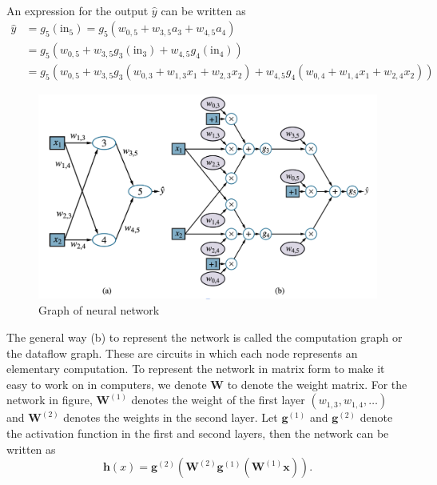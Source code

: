 \documentclass{article}
\begin{document}
      \paragraph{} An expression for the output $\hat{y}$ can be written as 
           \begin{align*}
            \hat{y} &= g_5(\text{in}_5) = g_5(w_{0,5} + w_{3,5}a_3 + w_{4,5}a_4)\\
            &= g_5(w_{0,5} + w_{3,5}g_3(\text{in}_3) + w_{4,5}g_4(\text{in}_4))\\
            &= g_5(w_{0,5} + w_{3,5}g_3(w_{0,3} + w_{1,3}x_1 + w_{2,3}x_2)
            + w_{4,5}g_4(w_{0,4} + w_{1,4}x_1 + w_{2,4}x_2))
           \end{align*}

           \newpage

           \begin{figure}[H]
            \centering
            \includegraphics[width=1\textwidth]{ss.png}
            \caption{Graph of neural network}
         \end{figure}

         The general way (b) to represent the network is called the computation graph or the dataflow graph. These are circuits in which each node represents an elementary computation.
         To represent the network in matrix form to make it easy to work on in computers, we denote \textbf{W} to denote the weight matrix. For the network in figure, $\textbf{W}^{(1)}$ denotes the weight of the first layer $(w_{1,3}, w_{1,4},\ldots)$ and $\textbf{W}^{(2)}$ denotes the weights in the second layer. Let $\textbf{g}^{(1)}$ and $\textbf{g}^{(2)}$ denote the activation function in the first and second layers, then the network can be written as
         \begin{equation*}
          \mathbf{h}(x) = \mathbf{g}^{(2)}\left(\mathbf{W}^{(2)}\mathbf{g}^{(1)}\left(\mathbf{W}^{(1)}\mathbf{x}\right)\right).
         \end{equation*}
\end{document}
